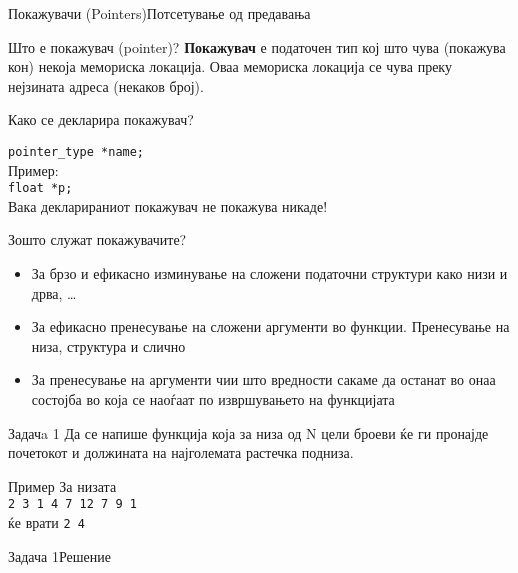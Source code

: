 

\begin{frame}[fragile,shrink=10]{Покажувачи (Pointers)}{Потсетување од
предавања}
  \begin{block}{Што е покажувач (pointer)?}
    \textbf{Покажувач} е \alert{податочен тип} кој што чува (покажува кон)
    некоја мемориска локација. Оваа мемориска локација се чува преку нејзината адреса (некаков
    број).
  \end{block}
  \begin{block}{Како се декларира покажувач?}
  
    \texttt{pointer\_type *name;}\\
    Пример:\\
    \texttt{float *p;}\\
    \alert{Вака декларираниот покажувач не покажува никаде!}
  \end{block}
  \begin{block}{Зошто служат покажувачите?}
    \begin{itemize}
      \item За брзо и ефикасно изминување на сложени податочни структури како
      низи и дрва, \ldots
      \item За ефикасно пренесување на сложени аргументи во функции. Пренесување
      на низа, структура и слично
      \item За пренесување на аргументи чии што вредности сакаме да останат во
      онаа состојба во која се наоѓаат по извршувањето на функцијата
    \end{itemize}
  \end{block}
  
\end{frame}

\begin{frame}{Задачa 1}
Да се напише функција која за низа од N цели броеви ќе ги пронајде почетокот и
должината на најголемата растечка подниза.
\begin{exampleblock}{Пример}
За низата\\
\texttt{2 3 {\color{red}1 4 7 12} 7 9 1}\\
ќе врати \texttt{2 4}
\end{exampleblock}
\end{frame}

\begin{frame}[fragile]{Задача 1}{Решение}
\begin{columns}


\end{columns}
\end{frame}

